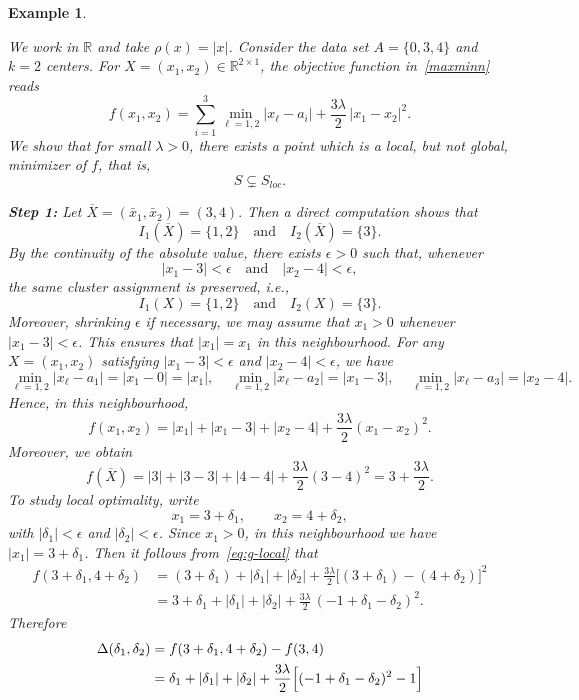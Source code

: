 \documentclass[11pt]{article}
\newtheorem{example}[theorem]{Example}
\theoremstyle{definition}
\newcommand{\R}{\mathbb{R}}
\newcommand{\1}{\mathbf{1}}
\def\Bar{\overline}
\begin{document}
\begin{example}\label{ex:local-lambda>0}
{\rm We work in $\R$ and take
$\rho(x)=|x|$. Consider the data set $A=\{0,3,4\}$
and $k=2$ centers. For $X=(x_1,x_2)\in\R^{2\times 1}$, the objective function
in~\eqref{maxminn} reads
\[
f(x_1,x_2)
=
\sum_{i=1}^3 \min_{\ell=1,2}|x_\ell-a_i|
+\frac{3\lambda}{2}\,|x_1-x_2|^2.
\]
We show that for small $\lambda>0$, there exists a point which is a
local, but not global, minimizer of $f$, that is,
$$S\subsetneq S_{loc}.$$

\medskip\noindent
\textbf{Step 1:}
Let $\Bar X=(\bar x_1,\bar x_2)=(3,4).$
Then a direct computation shows that
\[I_1(\Bar X)=\{1,2\}\quad\text{and}\quad
I_2(\Bar X)=\{3\}.\]
By the
continuity of the absolute value, there exists $\epsilon>0$ such that, whenever
\[
|x_1-3|<\epsilon
\quad\text{and}\quad
|x_2-4|<\epsilon,
\]
the same cluster assignment is preserved, i.e.,
\[
I_1(X)=\{1,2\}\quad\text{and}\quad I_2(X)=\{3\}.
\]
Moreover, shrinking $\epsilon$ if necessary, we may assume that $x_1>0$ whenever
$|x_1-3|<\epsilon$. This ensures that $|x_1|=x_1$ in this neighbourhood.
For any $X=(x_1,x_2)$ satisfying $|x_1-3|<\epsilon$ and $|x_2-4|<\epsilon$, we have
\[
\min_{\ell=1,2}|x_\ell-a_1|=|x_1-0|=|x_1|,
\quad
\min_{\ell=1,2}|x_\ell-a_2|=|x_1-3|,
\quad
\min_{\ell=1,2}|x_\ell-a_3|=|x_2-4|.
\]
Hence, in this neighbourhood,
\begin{equation}\label{eq:g-local}
f(x_1,x_2)
=
|x_1|+|x_1-3|+|x_2-4|
+\frac{3\lambda}{2}(x_1-x_2)^2.
\end{equation}
Moreover, we obtain
\[
f(\Bar X)
=
|3|+|3-3|+|4-4|
+\frac{3\lambda}{2}(3-4)^2
=
3+\frac{3\lambda}{2}.
\]
To study local optimality, write
\[
x_1=3+\delta_1,
\qquad
x_2=4+\delta_2,
\]
with $|\delta_1|<\epsilon$ and $|\delta_2|<\epsilon$. Since $x_1>0$, in this neighbourhood
we have $|x_1|=3+\delta_1$. Then it follows from~\eqref{eq:g-local} that
\[
\begin{aligned}
f(3+\delta_1,4+\delta_2)
&=
(3+\delta_1) + |\delta_1| + |\delta_2|
+\frac{3\lambda}{2}\bigl[(3+\delta_1)-(4+\delta_2)\bigr]^2\\
&=
3+\delta_1 + |\delta_1| + |\delta_2|
+\frac{3\lambda}{2}\,(-1+\delta_1-\delta_2)^2.
\end{aligned}
\]
Therefore
\[
\begin{aligned}
\Delta(\delta_1,\delta_2)
&= f(3+\delta_1,4+\delta_2) - f(3,4)\\
&=
\delta_1 + |\delta_1| + |\delta_2|
+\frac{3\lambda}{2}\Bigl[(-1+\delta_1-\delta_2)^2-1\Bigr]\\

\end{aligned}\]}
\end{example}
\end{document}
